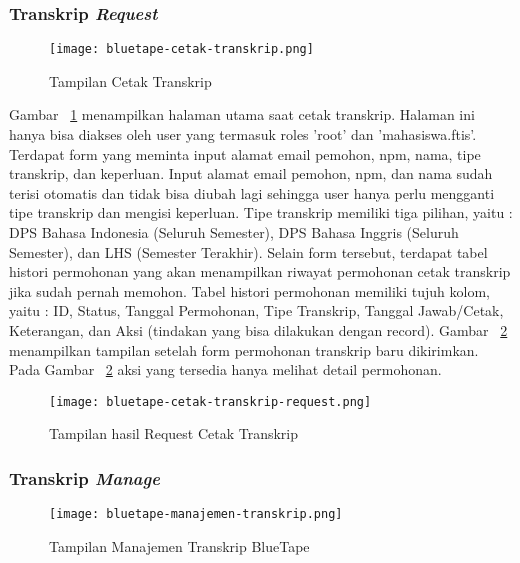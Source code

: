 	\subsubsection{Transkrip \textit{Request}} 
	\begin{figure}[H]
		\centering  
		\texttt{[image: bluetape-cetak-transkrip.png]}  
		\caption[Tampilan Cetak Transkrip]{Tampilan Cetak Transkrip} 
		\label{fig:bluetape-cetak-transkrip} 
	\end{figure}
	
	Gambar~ \ref{fig:bluetape-cetak-transkrip} menampilkan halaman utama saat cetak transkrip. Halaman ini hanya bisa diakses oleh user yang termasuk roles 'root' dan 'mahasiswa.ftis'. Terdapat form yang meminta input alamat email pemohon, npm, nama, tipe transkrip, dan keperluan. Input alamat email pemohon, npm, dan nama sudah terisi otomatis dan tidak bisa diubah lagi sehingga user hanya perlu mengganti tipe transkrip dan mengisi keperluan. Tipe transkrip memiliki tiga pilihan, yaitu : DPS Bahasa Indonesia (Seluruh Semester), DPS Bahasa Inggris (Seluruh Semester), dan LHS (Semester Terakhir). Selain form tersebut, terdapat tabel histori permohonan yang akan menampilkan riwayat permohonan cetak transkrip jika sudah pernah memohon. Tabel histori permohonan memiliki tujuh kolom, yaitu : ID, Status, Tanggal Permohonan, Tipe Transkrip, Tanggal Jawab/Cetak, Keterangan, dan Aksi (tindakan yang bisa dilakukan dengan record). Gambar~ \ref{fig:bluetape-cetak-transkrip-request} menampilkan tampilan setelah form permohonan transkrip baru dikirimkan. Pada Gambar~ \ref{fig:bluetape-cetak-transkrip-request} aksi yang tersedia hanya melihat detail permohonan.

	\begin{figure}[H]
		\centering  
		\texttt{[image: bluetape-cetak-transkrip-request.png]}  
		\caption[Tampilan hasil Request Cetak Transkrip]{Tampilan hasil Request Cetak Transkrip} 
		\label{fig:bluetape-cetak-transkrip-request} 
	\end{figure}
	
	\subsubsection{Transkrip \textit{Manage}}
	\begin{figure}[H]
		\centering  
		\texttt{[image: bluetape-manajemen-transkrip.png]}  
		\caption[Tampilan Manajemen Transkrip BlueTape]{Tampilan Manajemen Transkrip BlueTape} 
		\label{fig:bluetape-manajemen-transkrip} 
	\end{figure}
	

